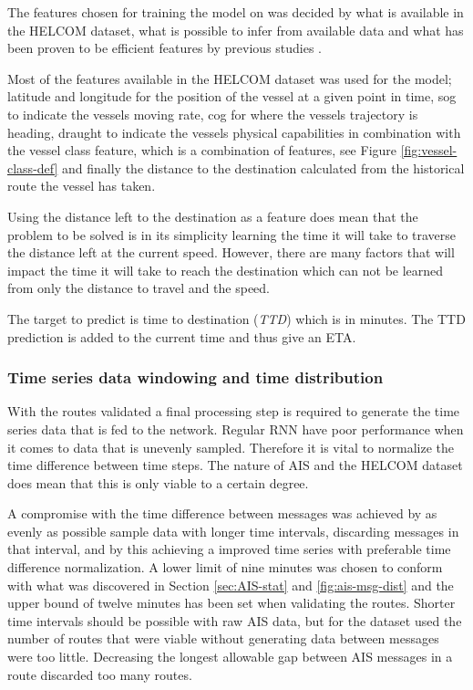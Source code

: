 \documentclass[../main.tex]{subfiles}
\begin{document}
The features chosen for training the model on was decided by what is available in the HELCOM dataset, what is possible to infer from available data and what has been proven to be efficient features by previous studies \cite{El_2020, Jahn_2018}.

Most of the features available in the HELCOM dataset was used for the model; latitude and longitude for the position of the vessel at a given point in time, sog to indicate the vessels moving rate, cog for where the vessels trajectory is heading, draught to indicate the vessels physical capabilities in combination with the vessel class feature, which is a combination of features, see Figure \ref{fig:vessel-class-def} and finally the distance to the destination calculated from the historical route the vessel has taken.

Using the distance left to the destination as a feature does mean that the problem to be solved is in its simplicity learning the time it will take to traverse the distance left at the current speed. However, there are many factors that will impact the time it will take to reach the destination which can not be learned from only the distance to travel and the speed.

The target to predict is time to destination (\textit{TTD}) which is in minutes. The TTD prediction is added to the current time and thus give an ETA.

\subsubsection{Time series data windowing and time distribution}
\label{sec:timeseries}

With the routes validated a final processing step is required to generate the time series data that is fed to the network. Regular RNN have poor performance when it comes to data that is unevenly sampled. Therefore it is vital to normalize the time difference between time steps. The nature of AIS and the HELCOM dataset does mean that this is only viable to a certain degree.

A compromise with the time difference between messages was achieved by as evenly as possible sample data with longer time intervals, discarding messages in that interval, and by this achieving a improved time series with preferable time difference normalization. A lower limit of nine minutes was chosen to conform with what was discovered in Section \ref{sec:AIS-stat} and \ref{fig:ais-msg-dist} and the upper bound of twelve minutes has been set when validating the routes. Shorter time intervals should be possible with raw AIS data, but for the dataset used the number of routes that were viable without generating data between messages were too little. Decreasing the longest allowable gap between AIS messages in a route discarded too many routes.
\end{document}
